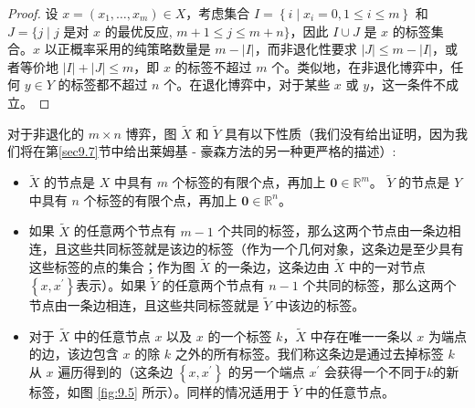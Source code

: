 \begin{proof}
设 \(x = \left( {{x}_{1},\ldots,{x}_{m}}\right)  \in  X\)，考虑集合 \(I = \left\{  {i \mid  {x}_{i} = 0,1 \leq  i \leq  m}\right\}\) 和 \(J = \{ j \mid  j\) 是对 \(x \) 的最优反应, \(m + 1 \leq  j \leq  m + n\}\)，因此 \(I \cup  J\) 是 \(x\) 的标签集合。\(x\) 以正概率采用的纯策略数量是 \(m - \left| I\right|\)，而非退化性要求 \(\left| J\right|  \leq  m - \left| I\right|\)，或者等价地 \(\left| I\right|  + \left| J\right|  \leq  m\)，即 \(x\) 的标签不超过 \(m\) 个。类似地，在非退化博弈中，任何 \(y \in  Y\) 的标签都不超过 \(n\) 个。在退化博弈中，对于某些 \(x\) 或 \(y\)，这一条件不成立。
\end{proof}


对于非退化的 \(m \times  n\) 博弈，图 \(\widetilde{X}\) 和 \(\widetilde{Y}\) 具有以下性质（我们没有给出证明，因为我们将在第\ref{sec9.7}节中给出莱姆基 - 豪森方法的另一种更严格的描述）:


\begin{itemize}
\item \(\widetilde{X}\) 的节点是 \(X\) 中具有 \(m\) 个标签的有限个点，再加上 \(\mathbf{0} \in  {\mathbb{R}}^{m}\)。 \(\widetilde{Y}\) 的节点是 \(Y\) 中具有 \(n\) 个标签的有限个点，再加上 \(\mathbf{0} \in  {\mathbb{R}}^{n}\)。


\item 如果 \(\widetilde{X}\) 的任意两个节点有 \(m - 1\) 个共同的标签，那么这两个节点由一条边相连，且这些共同标签就是该边的标签（作为一个几何对象，这条边是至少具有这些标签的点的集合；作为图 \(\widetilde{X}\) 的一条边，这条边由 \(\widetilde{X}\) 中的一对节点 \(\left\{  {x,{x}^{\prime }}\right\}\)表示）。如果 \(\widetilde{Y}\) 的任意两个节点有 \(n - 1\) 个共同的标签，那么这两个节点由一条边相连，且这些共同标签就是 \(\widetilde{Y}\) 中该边的标签。

\item 对于 \(\widetilde{X}\) 中的任意节点 \(x\) 以及 \(x\) 的一个标签 \(k\)，\(\widetilde{X}\) 中存在唯一一条以 \(x\) 为端点的边，该边包含 \(x\) 的除 \(k\) 之外的所有标签。我们称这条边是通过去掉标签 \(k\) 从 \(x\) 遍历得到的（这条边 \(\left\{  {x,{x}^{\prime }}\right\}\) 的另一个端点 \({x}^{\prime }\) 会获得一个不同于\(k\)的新标签，如图 \ref{fig:9.5} 所示）。同样的情况适用于 \(\widetilde{Y}\) 中的任意节点。
\end{itemize}

